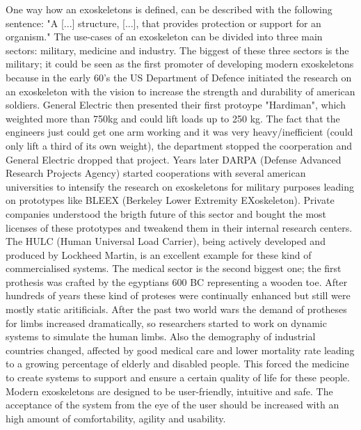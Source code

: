 \documentclass[letterpaper, 10 pt, conference]{ieeeconf}  %
\begin{document}
One way how an exoskeletons is defined, can be described with the following sentence:
"A [...] structure, [...], that provides protection or support for an organism."
The use-cases of an exoskeleton can be divided into three main sectors: military, medicine and industry.\newline
The biggest of these three sectors is the military; it could be seen as the first promoter of developing modern exoskeletons because in the early 60's the US Department of Defence initiated the research on an exoskeleton with the vision to increase the strength and durability of american soldiers. General Electric then presented their first protoype "Hardiman", which weighted more than 750kg and could lift loads up to 250 kg. The fact that the engineers just could get one arm working and it was very heavy/inefficient (could only lift a third of its own weight), the department stopped the coorperation and General Electric dropped that project. Years later DARPA (Defense Advanced Research Projects Agency) started cooperations with several american universities to intensify the research on exoskeletons for military purposes leading on prototypes like BLEEX (Berkeley Lower Extremity EXoskeleton). Private companies understood the brigth future of this sector and bought the most licenses of these prototypes and tweakend them in their internal research centers. The HULC (Human Universal Load Carrier), being actively developed and produced by Lockheed Martin, is an excellent example for these kind of commercialised systems.\newline
The medical sector is the second biggest one; the first prothesis was crafted by the egyptians 600 BC representing a wooden toe. After hundreds of years these kind of proteses were continually enhanced but still were mostly static aritificials. After the past two world wars the demand of protheses for limbs increased dramatically, so researchers started to work on dynamic systems to simulate the human limbs. Also the demography of industrial countries changed, affected by good medical care and lower mortality rate leading to a growing percentage of elderly and disabled people. This forced the medicine to create systems to support and ensure a certain quality of life  for these people.\newline
Modern exoskeletons are designed to be user-friendly, intuitive and safe. The acceptance of the system from the eye of the user should be increased with an high amount of comfortability, agility and usability. 
\end{document}
